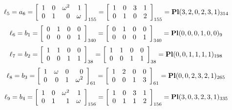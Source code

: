 $$
\ell_{5} = a_{6} = 
\left[
\begin{array}{*{4}{r}}
1 & 0 & \omega^{2} & 1\\
0 & 1 & 0 & \omega \\
\end{array}
\right]
_{155}
=
\left[
\begin{array}{*{4}c}
1  & 0  & 3  & 1\\
0  & 1  & 0  & 2\\
\end{array}
\right]_{155}
={\rm\bf Pl}(3,2,0,2,3,1 )_{314}$$
$$
\ell_{6} = b_{1} = 
\left[
\begin{array}{*{4}{r}}
0 & 1 & 0 & 0\\
0 & 0 & 0 & 1\\
\end{array}
\right]
_{340}
=
\left[
\begin{array}{*{4}c}
0  & 1  & 0  & 0\\
0  & 0  & 0  & 1\\
\end{array}
\right]_{340}
={\rm\bf Pl}(0,0,0,1,0,0 )_{9}$$
$$
\ell_{7} = b_{2} = 
\left[
\begin{array}{*{4}{r}}
1 & 1 & 0 & 0\\
0 & 0 & 1 & 1\\
\end{array}
\right]
_{38}
=
\left[
\begin{array}{*{4}c}
1  & 1  & 0  & 0\\
0  & 0  & 1  & 1\\
\end{array}
\right]_{38}
={\rm\bf Pl}(0,0,1,1,1,1 )_{198}$$
$$
\ell_{8} = b_{3} = 
\left[
\begin{array}{*{4}{r}}
1 & \omega  & 0 & 0\\
0 & 0 & 1 & \omega^{2}\\
\end{array}
\right]
_{61}
=
\left[
\begin{array}{*{4}c}
1  & 2  & 0  & 0\\
0  & 0  & 1  & 3\\
\end{array}
\right]_{61}
={\rm\bf Pl}(0,0,2,3,2,1 )_{265}$$
$$
\ell_{9} = b_{4} = 
\left[
\begin{array}{*{4}{r}}
1 & 0 & \omega^{2} & 1\\
0 & 1 & 1 & \omega \\
\end{array}
\right]
_{156}
=
\left[
\begin{array}{*{4}c}
1  & 0  & 3  & 1\\
0  & 1  & 1  & 2\\
\end{array}
\right]_{156}
={\rm\bf Pl}(3,0,3,2,3,1 )_{335}$$
